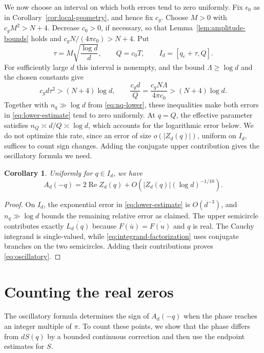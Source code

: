 \documentclass[11pt,reqno]{amsart}
\numberwithin{equation}{section}
\newtheorem{corollary}[theorem]{Corollary}
\renewcommand{\Re}{\operatorname{Re}}
\begin{document}
We now choose an interval on which both errors tend to zero
uniformly. Fix $\epsilon_0$ as in
Corollary~\ref{cor:local-geometry}, and hence fix $c_g$.
Choose $M>0$ with $c_gM^2>N+4$. Decrease $c_0>0$, if
necessary, so that Lemma~\ref{lem:amplitude-bounds} holds and
$c_gN/(4\pi c_0)>N+4$. Put
\begin{equation}\label{eq:window}
 \tau=M\sqrt{\frac{\log d}{d}},\qquad Q=c_0T,
 \qquad I_d=[q_e+\tau,Q].
\end{equation}
For sufficiently large $d$ this interval is nonempty, and the bound
$\Lambda\ge\log d$ and the chosen constants give
\[
 c_gd\tau^2>(N+4)\log d,
 \qquad
 \frac{c_gd}{Q}=\frac{c_gN\Lambda}{4\pi c_0}>(N+4)\log d.
\]
Together with $n_q\gg\log d$ from \eqref{eq:nq-lower}, these
inequalities make both errors in \eqref{eq:lower-estimate} tend
to zero uniformly. At $q=Q$, the effective parameter satisfies
$n_Q\asymp d/Q\asymp\log d$, which accounts for the logarithmic
error below. We do not optimize this rate, since an error of
size $o(|Z_d(q)|)$, uniform on $I_d$, suffices to count sign
changes.
Adding the conjugate upper contribution gives the oscillatory
formula we need.

\begin{corollary}\label{cor:oscillatory}
Uniformly for $q\in I_d$, we have
\begin{equation}\label{eq:oscillatory}
 A_d(-q)=2\Re Z_d(q)+O\!\left(|Z_d(q)|(\log d)^{-1/10}\right).
\end{equation}
\end{corollary}

\begin{proof}
On $I_d$, the exponential error in \eqref{eq:lower-estimate}
is $O(d^{-3})$, and $n_q\gg\log d$ bounds the remaining relative
error as claimed. The upper semicircle contributes exactly
$\overline{L_d(q)}$ because $F(\overline u)=\overline{F(u)}$
and $q$ is real. The Cauchy integrand is single-valued, while
\eqref{eq:integrand-factorization} uses conjugate branches on
the two semicircles. Adding their contributions proves
\eqref{eq:oscillatory}.
\end{proof}

\section{Counting the real zeros}\label{sec:counting}

The oscillatory formula determines the sign of $A_d(-q)$ when the
phase reaches an integer multiple of $\pi$. To count these points,
we show that the phase differs from $dS(q)$ by a bounded continuous
correction and then use the endpoint estimates for $S$.
\end{document}
